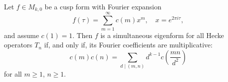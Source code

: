 Let $f \in M_{k,0}$ be a cusp form with Fourier expansion
$$f(\tau) = \sum_{m=1}^{\infty} c(m)x^m, \quad x = e^{2\pi i\tau},$$
and assume $c(1) = 1$. Then $f$ is a simultaneous eigenform for all Hecke operators $T_n$ if, and only if, its Fourier coefficients are multiplicative:
$$c(m)c(n) = \sum_{d \mid (m,n)} d^{k-1} c\left(\frac{mn}{d^2}\right)$$
for all $m \geq 1$, $n \geq 1$.
